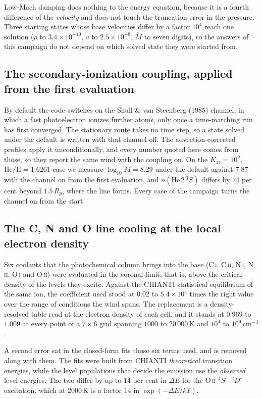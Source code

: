 \documentclass[english,a4paper]{my_memo}
\begin{document}
Low-Mach damping does nothing to the energy equation, because it is a fourth
difference of the \emph{velocity} and does not touch the truncation error in
the pressure. Three starting states whose base velocities differ by a factor
$10^{4}$ reach one solution ($\rho$ to $3.4\times10^{-10}$, $v$ to
$2.5\times10^{-8}$, $\dot M$ to seven digits), so the answers of this
campaign do not depend on which solved state they were started from.

\subsection{The secondary-ionization coupling, applied from the first evaluation}

By default the code switches on the Shull \& van Steenberg (1985) channel, in
which a fast photoelectron ionizes further atoms, only once a time-marching run
has first converged. The stationary route takes no time step, so a state solved
under the default is written with that channel off. The advection-corrected
profiles apply it unconditionally, and every number quoted here comes from
those, so they report the same wind with the coupling on. On the
$K_{zz} = 10^{9}$, $\mathrm{He/H} = 1.6261$ case we measure
$\log_{10}\dot M = 8.29$ under the default against $7.87$ with the channel on
from the first evaluation, and $n(\mathrm{He}\,2\,^3S)$ differs by $74$ per
cent beyond $1.5\,R_p$, where the line forms. Every case of the campaign
turns the channel on from the start.

\subsection{The C, N and O line cooling at the local electron density}
\label{sec:cnocooling}

Six coolants that the photochemical column brings into the base
(C\,\textsc{i}, C\,\textsc{ii}, N\,\textsc{i}, N\,\textsc{ii}, O\,\textsc{i}
and O\,\textsc{ii}) were evaluated in the coronal limit, that is, above the
critical density of the levels they excite. Against the CHIANTI statistical
equilibrium of the same ion, the coefficient used stood at $0.02$ to
$5.4\times10^{4}$ times the right value over the range of conditions the wind
spans. The replacement is a density-resolved table read at the electron
density of each cell, and it stands at $0.969$ to $1.009$ at every point of a
$7\times6$ grid spanning $1000$ to $20\,000$\,K and $10^{4}$ to
$10^{9}$\,cm$^{-3}$.

A second error sat in the closed-form fits those six terms used, and is
removed along with them. The fits were built from CHIANTI \emph{theoretical}
transition energies, while the level populations that decide the emission use
the \emph{observed} level energies. The two differ by up to $14$ per cent in
$\Delta E$ for the O\,\textsc{ii} $^4S^{\circ}$--$^2D^{\circ}$ excitation,
which at $2000$\,K is a factor $14$ in $\exp(-\Delta E/kT)$.
\end{document}
